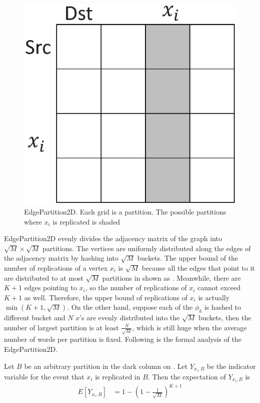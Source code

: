 \begin{figure}[h]
	\centering
	\includegraphics[scale=0.25]{figs/2dhash.eps}
	\caption{EdgePartition2D. Each grid is a partition. 
	The possible partitions where $x_i$ is
	replicated is shaded}
	\label{fig:2dhash}
\end{figure}

EdgePartition2D evenly divides the adjacency matrix of the graph into $\sqrt{M}
\times \sqrt{M}$ partitions. The vertices are uniformly distributed along the
edges of the adjacency matrix by hashing into $\sqrt{M}$ buckets. The upper
bound of the number of replications of a vertex $x_i$ is $\sqrt{M}$ because all
the edges that point to it are distributed to at most $\sqrt{M}$ partitions
in shown as .  Meanwhile, there are $K+1$
edges pointing to $x_i$, so the number of replications of $x_i$ cannot exceed
$K+1$ as well. Therefore, the upper bound of replications of $x_i$ is actually
$\min(K+1, \sqrt{M})$. On the other hand, suppose each of the $\phi_k$ is
hashed to different bucket and $N$ $x$'s are evenly distributed into the
$\sqrt{M}$ buckets, then the number of largest partition is at least
$\frac{N}{\sqrt{M}}$, which is still huge when the average number of words per
partition is fixed. Following is the formal analysis of the EdgePartition2D.

Let $B$ be an arbitrary
partition in the dark column on .
Let $Y_{x_i, B}$ be the indicator variable for the event that $x_i$ is
replicated in $B$.
Then the expectation of $Y_{x_i, B}$ is
\begin{align*}
	E[Y_{x_i, B}] &= 1 - (1 - \frac{1}{\sqrt{M}})^{K+1} \\
\end{align*}

